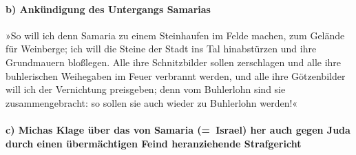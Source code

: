 \hypertarget{b-ankuxfcndigung-des-untergangs-samarias}{%
\paragraph{b) Ankündigung des Untergangs
Samarias}\label{b-ankuxfcndigung-des-untergangs-samarias}}

 »So will ich denn Samaria zu einem Steinhaufen im Felde
machen, zum Gelände für Weinberge; ich will die Steine der Stadt ins Tal
hinabstürzen und ihre Grundmauern bloßlegen.  Alle ihre
Schnitzbilder sollen zerschlagen und alle ihre buhlerischen Weihegaben
im Feuer verbrannt werden, und alle ihre Götzenbilder will ich der
Vernichtung preisgeben; denn vom Buhlerlohn sind sie zusammengebracht:
so sollen sie auch wieder zu Buhlerlohn werden!«

\hypertarget{c-michas-klage-uxfcber-das-von-samaria-israel-her-auch-gegen-juda-durch-einen-uxfcbermuxe4chtigen-feind-heranziehende-strafgericht}{%
\paragraph{c) Michas Klage über das von Samaria (=~Israel) her auch
gegen Juda durch einen übermächtigen Feind heranziehende
Strafgericht}\label{c-michas-klage-uxfcber-das-von-samaria-israel-her-auch-gegen-juda-durch-einen-uxfcbermuxe4chtigen-feind-heranziehende-strafgericht}}

